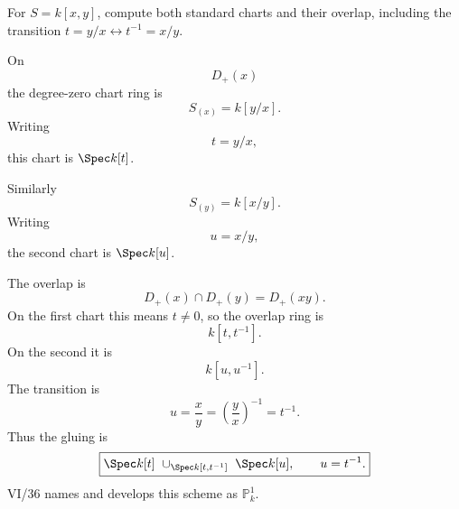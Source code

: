 \begin{problem}\label{prob:vi35-07}
For \(S=k[x,y]\), compute both standard charts and their overlap, including the transition \(t=y/x\leftrightarrow t^{-1}=x/y\).
\end{problem}

\ifdefined\FullProblemDossiers
\begin{solution}
On
\[
D_+(x)
\]
the degree-zero chart ring is
\[
S_{(x)}=k[y/x].
\]
Writing
\[
t=y/x,
\]
this chart is \(\Spec k[t]\).

Similarly
\[
S_{(y)}=k[x/y].
\]
Writing
\[
u=x/y,
\]
the second chart is \(\Spec k[u]\).

The overlap is
\[
D_+(x)\cap D_+(y)=D_+(xy).
\]
On the first chart this means \(t\neq0\), so the overlap ring is
\[
k[t,t^{-1}].
\]
On the second it is
\[
k[u,u^{-1}].
\]
The transition is
\[
u=\frac xy=\left(\frac yx\right)^{-1}=t^{-1}.
\]
Thus the gluing is
\[
\boxed{
\Spec k[t]\ \cup_{\Spec k[t,t^{-1}]}\ \Spec k[u],
\qquad u=t^{-1}.
}
\]
VI/36 names and develops this scheme as \(\mathbb P^1_k\).
\end{solution}
\fi
